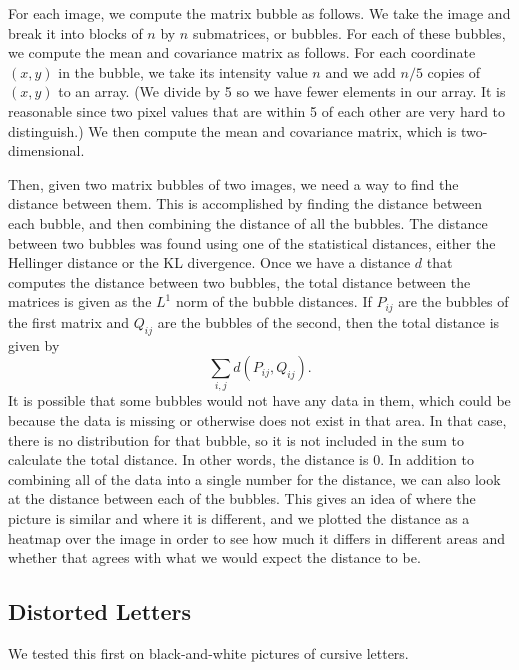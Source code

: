 \documentclass{article}
\begin{document}
For each image, we compute the matrix bubble as follows. We take the image and
break it into blocks of $n$ by $n$ submatrices, or bubbles. For each of these
bubbles, we compute the mean and covariance matrix as follows. For each
coordinate $(x, y)$ in the bubble, we take its intensity value $n$ and we add
$n/5$ copies of $(x, y)$ to an array. (We divide by 5 so we have fewer elements
in our array. It is reasonable since two pixel values that are within 5 of each
other are very hard to distinguish.) We then compute the mean and covariance
matrix, which is two-dimensional.

Then, given two matrix bubbles of two images, we need a way to find the
distance between them. This is accomplished by finding the distance between
each bubble, and then combining the distance of all the bubbles. The distance
between two bubbles was found using one of the statistical distances, either
the Hellinger distance or the KL divergence. Once we have a distance $d$ that
computes the distance between two bubbles, the total distance between the
matrices is given as the $L^1$ norm of the bubble distances. If $P_{ij}$ are
the bubbles of the first matrix and $Q_{ij}$ are the bubbles of the second,
then the total distance is given by
\[
    \sum_{i,j} d(P_{ij},Q_{ij}).
\]
It is possible that some bubbles would not have any data in them, which could
be because the data is missing or otherwise does not exist in that area. In
that case, there is no distribution for that bubble, so it is not included in
the sum to calculate the total distance. In other words, the distance is 0. In
addition to combining all of the data into a single number for the distance, we
can also look at the distance between each of the bubbles. This gives an idea
of where the picture is similar and where it is different, and we plotted the
distance as a heatmap over the image in order to see how much it differs in
different areas and whether that agrees with what we would expect the distance
to be.

\subsection{Distorted Letters}

We tested this first on black-and-white pictures of cursive
letters.\cite{alphabetsprintables}
\end{document}
